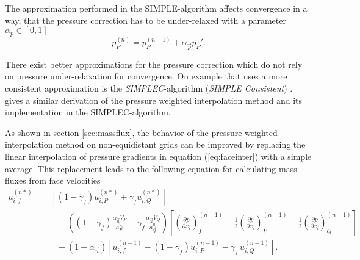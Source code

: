 The approximation performed in the SIMPLE-algorithm affects convergence in a way, that the pressure correction has to be under-relaxed with a parameter \(\alpha_p \in [0,1]\)
\begin{equation}
  \label{eq:pressupdate}
  p_P^{(n)} = p_P^{(n-1)} + \alpha_{\vec{p}} p_P'.
\end{equation}

There exist better approximations for the pressure correction which do not rely on pressure under-relaxation for convergence. On example that uses a more consistent approximation is the \emph{SIMPLEC}-algorithm (\emph{SIMPLE Consistent}) \cite{doormaal84}. \cite{miller88} gives a similar derivation of the pressure weighted interpolation method and its implementation in the SIMPLEC-algorithm.

As shown in section \ref{sec:massflux}, the behavior of the pressure weighted interpolation method on non-equidistant grids can be improved by replacing the linear interpolation of pressure gradients in equation (\ref{eq:faceinter}) with a simple average. This replacement leads to the following equation for calculating mass fluxes from face velocities
\begin{align}
  \label{eq:facecorr2}
  u_{i,f}^{(n*)} 
  &=
  \left[\left(1 - \gamma_f\right) u_{i,P}^{(n*)} + \gamma_f u_{i,Q}^{(n*)} \right] \nonumber\\[1em]
  &\quad\quad - 
  \left(\left(1 - \gamma_f\right) \frac{\alpha_\vec{u} V_P}{a_P^{u_i}} + \gamma_f \frac{\alpha_\vec{u} V_Q}{a_Q^{u_i}}\right)
  \left[ 
  \left(\frac{\partial p}{\partial x_i}\right)_f^{(n-1)} 
  -  \frac{1}{2} \left( \frac{\partial p}{\partial x_i} \right)_P^{(n-1)} 
  -  \frac{1}{2} \left(\frac{\partial p}{\partial x_i}\right)_Q^{(n-1)} 
  \right] \nonumber \\[1em]
  &\quad\quad + \left(1 - \alpha_\vec{u}\right) \left[ u_{i,f}^{(n-1)} - \left(1 - \gamma_f\right) u_{i,P}^{(n-1)} - \gamma_f \, u_{i,Q}^{(n-1)} \right].
\end{align}

